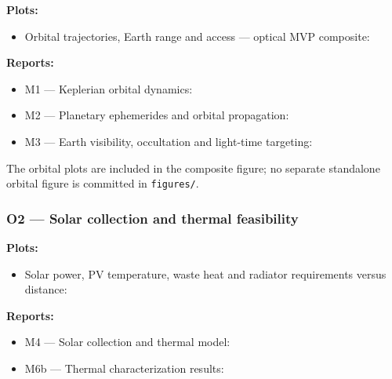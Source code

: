 \documentclass{article}
\begin{document}
\textbf{Plots:}

\begin{itemize}
\item Orbital trajectories, Earth range and access --- optical MVP composite: \href{https://github.com/extremefattypunch/Project-Dyson-Sphere/blob/helioswarm-m0-m6/figures/m6/mvp_optical_composite.png}{\textbullet}
\end{itemize}

\textbf{Reports:}

\begin{itemize}
\item M1 --- Keplerian orbital dynamics: \href{https://github.com/extremefattypunch/Project-Dyson-Sphere/blob/helioswarm-m0-m6/docs/milestones/M1.md}{\textbullet}
\item M2 --- Planetary ephemerides and orbital propagation: \href{https://github.com/extremefattypunch/Project-Dyson-Sphere/blob/helioswarm-m0-m6/docs/milestones/M2.md}{\textbullet}
\item M3 --- Earth visibility, occultation and light-time targeting: \href{https://github.com/extremefattypunch/Project-Dyson-Sphere/blob/helioswarm-m0-m6/docs/milestones/M3.md}{\textbullet}
\end{itemize}

The orbital plots are included in the composite figure; no separate standalone orbital figure is committed in \texttt{figures/}.

\subsubsection*{O2 --- Solar collection and thermal feasibility}

\textbf{Plots:}

\begin{itemize}
\item Solar power, PV temperature, waste heat and radiator requirements versus distance: \href{https://github.com/extremefattypunch/Project-Dyson-Sphere/blob/helioswarm-m0-m6/figures/m6b/power_thermal_vs_distance.png}{\textbullet}
\end{itemize}

\textbf{Reports:}

\begin{itemize}
\item M4 --- Solar collection and thermal model: \href{https://github.com/extremefattypunch/Project-Dyson-Sphere/blob/helioswarm-m0-m6/docs/milestones/M4.md}{\textbullet}
\item M6b --- Thermal characterization results: \href{https://github.com/extremefattypunch/Project-Dyson-Sphere/blob/helioswarm-m0-m6/docs/milestones/M6b.md}{\textbullet}
\end{itemize}
\end{document}
